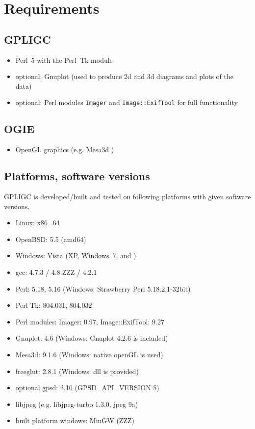 \section{Requirements}
\label{requirements}

\subsection*{GPLIGC}

\begin{itemize}
\item Perl~5 with the Perl~Tk module \cite{perl,perltk}
\item {\scriptsize optional:} Gnuplot \cite{gnuplot} (used to produce 2d and 3d diagrams and plots of the data)
\item {\scriptsize optional:} Perl modules \texttt{Imager} \cite{imager} and \texttt{Image::ExifTool} \cite{exiftool} for full functionality
\end{itemize}


\subsection*{OGIE}

\begin{itemize}
\item OpenGL graphics (e.g. Mesa3d \cite{mesa})
\end{itemize}


\subsection*{Platforms, software versions}
GPLIGC is developed/built and tested on following platforms with given software versions.

\begin{itemize}
\item Linux: x86\_64
\item OpenBSD: 5.5 (amd64)
\item Windows: Vista (XP, Windows~7, and )
\item gcc: 4.7.3 / 4.8.ZZZ / 4.2.1
\item Perl: 5.18, 5.16 (Windows: Strawberry Perl 5.18.2.1-32bit)
\item Perl Tk: 804.031, 804.032
\item Perl modules: Imager: 0.97, Image::ExifTool: 9.27
\item Gnuplot: 4.6 (Windows: Gnuplot-4.2.6 is included)
\item Mesa3d: 9.1.6 (Windows: native openGL is used)
\item freeglut: 2.8.1 (Windows: dll is provided)
\item {\scriptsize optional} gpsd: 3.10 (GPSD\_API\_VERSION 5)
\item libjpeg (e.g. libjpeg-turbo 1.3.0, jpeg 9a)
\item built platform windows: MinGW (ZZZ)
\end{itemize}


